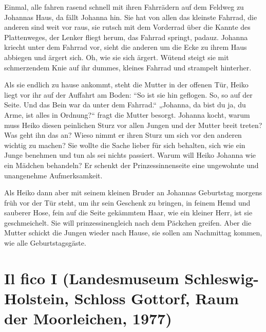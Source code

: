 \documentclass[10pt,titlepage,a5paper]{book}
\begin{document}
Einmal, alle fahren rasend schnell mit ihren Fahrrädern auf dem Feldweg zu Johannas Haus, da fällt Johanna hin. Sie hat von allen das kleinste Fahrrad, die anderen sind weit vor raus, sie rutsch mit dem Vorderrad über die Kannte des Plattenweges, der Lenker fliegt herum, das Fahrrad springt, padauz. Johanna kriecht unter dem Fahrrad vor, sieht die anderen um die Ecke zu ihrem Haus abbiegen und ärgert sich. Oh, wie sie sich ärgert. Wütend steigt sie mit schmerzendem Knie auf ihr dummes, kleines Fahrrad und strampelt hinterher.

Als sie endlich zu hause ankommt, steht die Mutter in der offenen Tür, Heiko liegt vor ihr auf der Auffahrt am Boden: “So ist sie hin geflogen. So, so auf der Seite. Und das Bein war da unter dem Fahrrad.“ „Johanna, da bist du ja, du Arme, ist alles in Ordnung?“ fragt die Mutter besorgt.
 Johanna kocht, warum muss Heiko diesen peinlichen Sturz vor allen Jungen und der Mutter breit treten? Was geht ihn das an? Wieso nimmt er ihren Sturz um sich vor den anderen wichtig zu machen? Sie wollte die Sache lieber für sich behalten, sich wie ein Junge benehmen und tun als sei nichts passiert. Warum will Heiko Johanna wie ein Mädchen behandeln? Er schenkt der Prinzessinnenseite eine ungewohnte und unangenehme Aufmerksamkeit.
 
Als Heiko dann aber mit seinem kleinen Bruder an Johannas Geburtstag morgens früh vor der Tür steht, um ihr sein Geschenk zu bringen, in feinem Hemd und sauberer Hose, fein auf die Seite gekämmtem Haar, wie ein kleiner Herr, ist sie geschmeichelt. Sie will prinzessinengleich nach dem Päckchen greifen.  Aber die Mutter schickt die Jungen wieder nach Hause, sie sollen am Nachmittag kommen, wie alle Geburtstagsgäste.



\section*{Il fico I 
(Landesmuseum Schleswig-Holstein, Schloss Gottorf, Raum der Moorleichen, 1977)}
\end{document}
